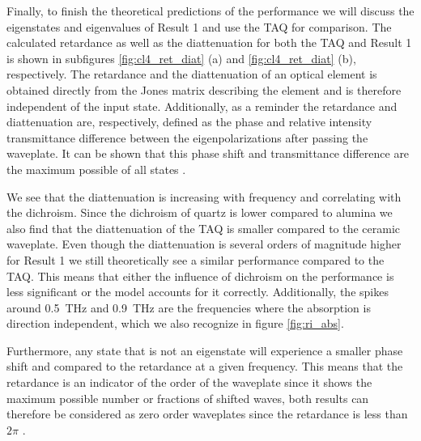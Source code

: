 Finally, to finish the theoretical predictions of the performance we will discuss the eigenstates and eigenvalues of Result 1 and use the TAQ for comparison. The calculated retardance as well as the diattenuation for both the TAQ and Result 1 is shown in subfigures \ref{fig:cl4_ret_diat} (a) and \ref{fig:cl4_ret_diat} (b), respectively. The retardance and the diattenuation of an optical element is obtained directly from the Jones matrix describing the element and is therefore independent of the input state. Additionally, as a reminder the retardance and diattenuation are, respectively, defined as the phase and relative intensity transmittance difference between the eigenpolarizations after passing the waveplate. It can be shown that this phase shift and transmittance difference are the maximum possible of all states \cite{Lu1994}. 

We see that the diattenuation is increasing with frequency and correlating with the dichroism. Since the dichroism of quartz is lower compared to alumina we also find that the diattenuation of the TAQ is smaller compared to the ceramic waveplate. Even though the diattenuation is several orders of magnitude higher for Result 1 we still theoretically see a similar performance compared to the TAQ. This means that either the influence of dichroism on the performance is less significant or the model accounts for it correctly. Additionally, the spikes around \SI{0.5}{\tera \hertz} and \SI{0.9}{\tera \hertz} are the frequencies where the absorption is direction independent, which we also recognize in figure \ref{fig:ri_abs}. 

Furthermore, any state that is not an eigenstate will experience a smaller phase shift and compared to the retardance at a given frequency. This means that the retardance is an indicator of the order of the waveplate since it shows the maximum possible number or fractions of shifted waves, both results can therefore be considered as zero order waveplates since the retardance is less than $2\pi$ \cite{Samoylov2004}. 

